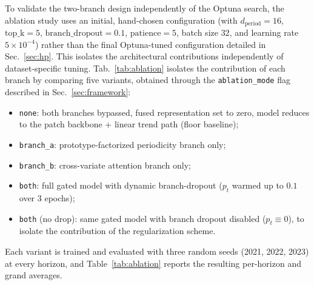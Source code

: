 \documentclass[10pt,journal]{IEEEtran}
\newcommand{\tab}[1]{Tab.~\ref{#1}}
\newcommand{\secref}[1]{Sec.~\ref{#1}}
\begin{document}
To validate the two-branch design independently of the Optuna search, the ablation study uses an initial, hand-chosen configuration (with $d_{\text{period}}=16$, $\mathrm{top\_k}=5$, $\mathrm{branch\_dropout}=0.1$, $\mathrm{patience}=5$, batch size $32$, and learning rate $5\!\times\!10^{-4}$) rather than the final Optuna-tuned configuration detailed in \secref{sec:hp}. This isolates the architectural contributions independently of dataset-specific tuning.
\tab{tab:ablation} isolates the contribution of each branch by comparing five variants, obtained through the \texttt{ablation\_mode} flag described in \secref{sec:framework}:
\begin{itemize}
    \item \texttt{none}: both branches bypassed, fused representation set to zero, model reduces to the patch backbone + linear trend path (floor baseline);
    \item \texttt{branch\_a}: prototype-factorized periodicity branch only;
    \item \texttt{branch\_b}: cross-variate attention branch only;
    \item \texttt{both}: full gated model with dynamic branch-dropout ($p_t$ warmed up to $0.1$ over 3 epochs);
    \item \texttt{both} (no drop): same gated model with branch dropout disabled ($p_t \equiv 0$), to isolate the contribution of the regularization scheme.
\end{itemize}
Each variant is trained and evaluated with three random seeds (2021, 2022, 2023) at every horizon, and Table~\ref{tab:ablation} reports the resulting per-horizon and grand averages.
\end{document}
